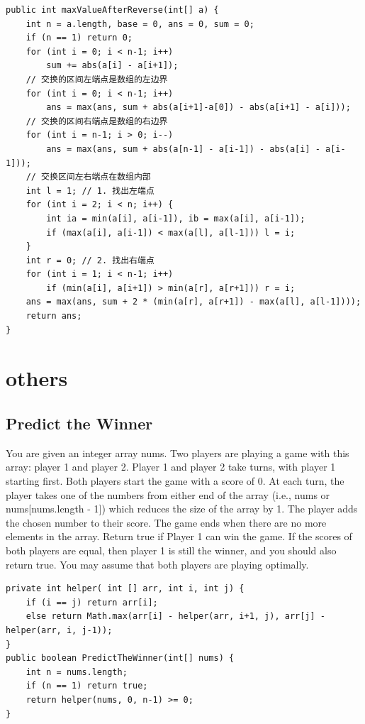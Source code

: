 \documentclass[9pt, b5paaper]{book}
\begin{document}
\begin{verbatim}
public int maxValueAfterReverse(int[] a) { 
    int n = a.length, base = 0, ans = 0, sum = 0;
    if (n == 1) return 0;
    for (int i = 0; i < n-1; i++)
        sum += abs(a[i] - a[i+1]);
    // 交换的区间左端点是数组的左边界
    for (int i = 0; i < n-1; i++) 
        ans = max(ans, sum + abs(a[i+1]-a[0]) - abs(a[i+1] - a[i]));
    // 交换的区间右端点是数组的右边界
    for (int i = n-1; i > 0; i--)
        ans = max(ans, sum + abs(a[n-1] - a[i-1]) - abs(a[i] - a[i-1]));
    // 交换区间左右端点在数组内部
    int l = 1; // 1. 找出左端点
    for (int i = 2; i < n; i++) {
        int ia = min(a[i], a[i-1]), ib = max(a[i], a[i-1]);
        if (max(a[i], a[i-1]) < max(a[l], a[l-1])) l = i;
    }
    int r = 0; // 2. 找出右端点
    for (int i = 1; i < n-1; i++) 
        if (min(a[i], a[i+1]) > min(a[r], a[r+1])) r = i;
    ans = max(ans, sum + 2 * (min(a[r], a[r+1]) - max(a[l], a[l-1])));
    return ans;
}
\end{verbatim}

\chapter{others}
\label{sec-11}
\section{Predict the Winner}
\label{sec-11-1}
You are given an integer array nums. Two players are playing a game with this array: player 1 and player 2.
Player 1 and player 2 take turns, with player 1 starting first. Both players start the game with a score of 0. At each turn, the player takes one of the numbers from either end of the array (i.e., nums\footnotemark[1]{} or nums[nums.length - 1]) which reduces the size of the array by 1. The player adds the chosen number to their score. The game ends when there are no more elements in the array.
Return true if Player 1 can win the game. If the scores of both players are equal, then player 1 is still the winner, and you should also return true. You may assume that both players are playing optimally.
\begin{verbatim}
private int helper( int [] arr, int i, int j) {
    if (i == j) return arr[i];
    else return Math.max(arr[i] - helper(arr, i+1, j), arr[j] - helper(arr, i, j-1));
}
public boolean PredictTheWinner(int[] nums) {
    int n = nums.length;
    if (n == 1) return true;
    return helper(nums, 0, n-1) >= 0;
}
\end{verbatim}
\end{document}
